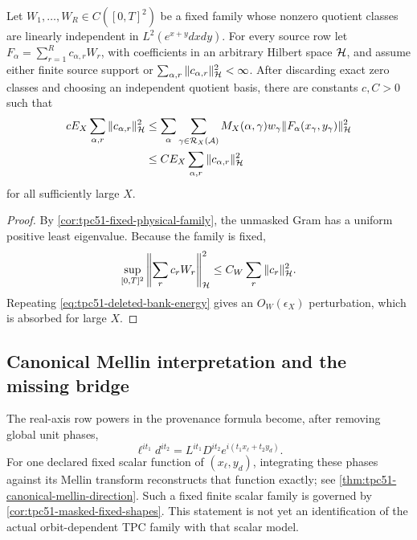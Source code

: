 \begin{corollary}
\label{cor:tpc51-masked-fixed-shapes}
Let \(W_1,\ldots,W_R\in C([0,T]^2)\) be a fixed family whose nonzero
quotient
classes are linearly independent in
\(L^2(e^{x+y}dxdy)\).  For every source row let
\(F_\alpha=\sum_{r=1}^R c_{\alpha,r}W_r\), with coefficients in an
arbitrary Hilbert space \(\mathcal H\), and assume either finite source support
or \(\sum_{\alpha,r}\|c_{\alpha,r}\|_{\mathcal H}^2<\infty\).  After
discarding exact zero classes
and choosing an independent quotient basis, there are constants
\(c,C>0\) such that
\begin{align}
 cE_X\sum_{\alpha,r}\|c_{\alpha,r}\|_{\mathcal H}^2
 &\leq
 \sum_{\alpha}\sum_{\gamma\in\mathcal R_X(\mathcal A)}
 M_X(\alpha,\gamma)w_\gamma
 \|F_\alpha(x_\gamma,y_\gamma)\|_{\mathcal H}^2
 \notag\\
 &\leq CE_X\sum_{\alpha,r}\|c_{\alpha,r}\|_{\mathcal H}^2
 \label{eq:tpc51-fixed-shape-masked-frame}
\end{align}
for all sufficiently large \(X\).
\end{corollary}

\begin{proof}
By \cref{cor:tpc51-fixed-physical-family}, the unmasked Gram has a
uniform positive least eigenvalue.  Because the family is fixed,
\[
 \sup_{[0,T]^2}\left\|\sum_r c_rW_r\right\|_{\mathcal H}^2
 \leq C_W\sum_r\|c_r\|_{\mathcal H}^2.
\]
Repeating \eqref{eq:tpc51-deleted-bank-energy} gives an
\(O_W(\epsilon_X)\) perturbation, which is absorbed for large \(X\).
\end{proof}

\subsection{Canonical Mellin interpretation and the missing bridge}

The real-axis row powers in the provenance formula become, after
removing global unit phases,
\begin{equation}
 \ell^{it_1}d^{it_2}
 =L^{it_1}D^{it_2}
 e^{i(t_1x_\ell+t_2y_d)}.
 \label{eq:tpc51-log-phase-identification}
\end{equation}
For one declared fixed scalar function of \((x_\ell,y_d)\), integrating
these phases against its Mellin transform reconstructs that function
exactly; see \cref{thm:tpc51-canonical-mellin-direction}.  Such a fixed
finite scalar family is governed by
\cref{cor:tpc51-masked-fixed-shapes}.  This statement is not yet an
identification of the actual orbit-dependent TPC family with that
scalar model.

